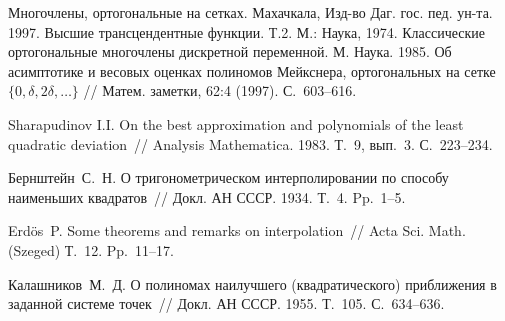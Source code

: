 \begin{thebibliography}{1}







 Многочлены, ортогональные на сетках. Махачкала, Изд-во Даг. гос. пед. ун-та. 1997.		
 Высшие трансцендентные функции. Т.2. М.: Наука, 1974.		
 Классические ортогональные многочлены дискретной переменной. М. Наука. 1985.		
 Об асимптотике и весовых оценках полиномов Мейкснера, ортогональных на сетке $\{0,\delta, 2\delta, \ldots\}$ //
Матем. заметки, 62:4 (1997). С.~603--616.



{Sharapudinov I.I.} On the best approximation and polynomials of the least quadratic deviation~// Analysis Mathematica. 1983. Т.~9, вып.~3. С.~223--234.

{Бернштейн~С.~Н.} О тригонометрическом интерполировании по способу наименьших квадратов~// Докл. АН СССР. 1934. Т.~4. Pp.~1--5.

{Erd{\"o}s~P.} Some theorems and remarks on interpolation~// Acta Sci. Math. (Szeged) Т.~12. Pp.~11--17.

{Калашников~М.~Д.} О полиномах наилучшего (квадратического) приближения в заданной системе точек~// Докл. АН СССР. 1955. Т.~105. С.~634--636.


\end{thebibliography}
